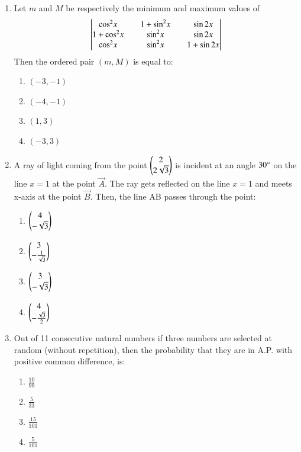 \documentclass[journal]{IEEEtran}
\theoremstyle{remark}
\begin{document}
\begin{enumerate}
\item  Let $m$ and $M$ be respectively the minimum and maximum values of 
\begin{align*}
    \begin{vmatrix}{\cos}^2x && 1+{\sin}^2x && \sin2x \\1+{\cos}^2x && {\sin}^2x && \sin2x \\ {\cos}^2x && {\sin}^2x && 1+\sin2x\end{vmatrix}
\end{align*}
Then the ordered pair $(m, M)$ is equal to:
\begin{multicols}{4}
\begin{enumerate}
\item $(-3, -1)$
\item $(-4, -1)$
\item $(1, 3)$
\item $(-3, 3)$
\end{enumerate}
\end{multicols}

\item  A ray of light coming from the point $\begin{pmatrix}2\\ 2\sqrt{3}\end{pmatrix}$ is incident at an angle $30\degree$ on the line $x = 1$ at the point $\vec{A}$. The ray gets reflected on the line $x = 1$ and meets x-axis at the point $\vec{B}$. Then, the line AB passes through the point:

\begin{multicols}{4}
\begin{enumerate}
\item $\begin{pmatrix}4 \\ -\sqrt{3}\end{pmatrix}$
\item $\begin{pmatrix}3 \\ -\frac{1}{\sqrt{3}}\end{pmatrix}$
\item $\begin{pmatrix}3 \\ -\sqrt{3}\end{pmatrix}$
\item $\begin{pmatrix}4 \\ -\frac{\sqrt{3}}{2}\end{pmatrix}$
\end{enumerate}
\end{multicols}

\item Out of 11 consecutive natural numbers if three numbers are selected at random (without repetition), then the probability that they are in A.P. with positive common difference, is: 

\begin{multicols}{4}
\begin{enumerate}
\item $\frac{10}{99}$
\item $\frac{5}{33}$
\item $\frac{15}{101}$
\item $\frac{5}{101}$
\end{enumerate}
\end{multicols}


\end{enumerate}
\end{document}
